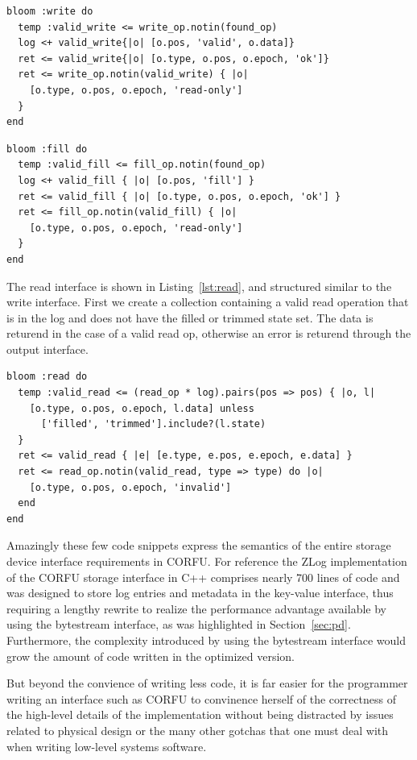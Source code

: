 \documentclass[10pt,twocolumn]{article}
\begin{document}
\begin{lstlisting}[caption={Write}, label=lst:write]
bloom :write do
  temp :valid_write <= write_op.notin(found_op)
  log <+ valid_write{|o| [o.pos, 'valid', o.data]}
  ret <= valid_write{|o| [o.type, o.pos, o.epoch, 'ok']}
  ret <= write_op.notin(valid_write) { |o|
    [o.type, o.pos, o.epoch, 'read-only']
  }
end
\end{lstlisting}

\begin{lstlisting}[caption={Fill}, label=lst:fill]
bloom :fill do
  temp :valid_fill <= fill_op.notin(found_op)
  log <+ valid_fill { |o| [o.pos, 'fill'] }
  ret <= valid_fill { |o| [o.type, o.pos, o.epoch, 'ok'] }
  ret <= fill_op.notin(valid_fill) { |o|
    [o.type, o.pos, o.epoch, 'read-only']
  }
end
\end{lstlisting}

The read interface is shown in Listing~\ref{lst:read}, and structured similar
to the write interface. First we create a collection containing a valid read
operation that is in the log and does not have the filled or trimmed state set.
The data is returend in the case of a valid read op, otherwise an error is
returend through the output interface.

\begin{lstlisting}[caption={Read}, label=lst:read]
bloom :read do
  temp :valid_read <= (read_op * log).pairs(pos => pos) { |o, l|
    [o.type, o.pos, o.epoch, l.data] unless
      ['filled', 'trimmed'].include?(l.state)
  }
  ret <= valid_read { |e| [e.type, e.pos, e.epoch, e.data] }
  ret <= read_op.notin(valid_read, type => type) do |o|
    [o.type, o.pos, o.epoch, 'invalid']
  end
end
\end{lstlisting}

Amazingly these few code snippets express the semantics of the entire storage
device interface requirements in CORFU. For reference the ZLog implementation
of the CORFU storage interface in C++ comprises nearly 700 lines of code and
was designed to store log entries and metadata in the key-value interface,
thus requiring a lengthy rewrite to realize the performance advantage
available by using the bytestream interface, as was highlighted in
Section~\ref{sec:pd}. Furthermore, the complexity introduced by using the
bytestream interface would grow the amount of code written in the optimized
version.

But beyond the convience of writing less code, it is far easier for the
programmer writing an interface such as CORFU to convinence herself of the
correctness of the high-level details of the implementation without being
distracted by issues related to physical design or the many other gotchas that
one must deal with when writing low-level systems software.
\end{document}
